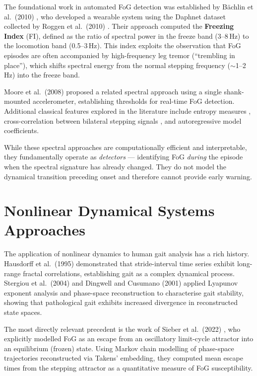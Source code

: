 \documentclass[12pt,a4paper,oneside]{report}
\numberwithin{equation}{chapter}
\numberwithin{figure}{chapter}
\numberwithin{table}{chapter}
\begin{document}
The foundational work in automated FoG detection was established by B\"{a}chlin et al.\ (2010) \cite{bachlin2010}, who developed a wearable system using the Daphnet dataset collected by Roggen et al.\ (2010) \cite{roggen2010}. Their approach computed the \textbf{Freezing Index} (FI), defined as the ratio of spectral power in the freeze band (3--8\,Hz) to the locomotion band (0.5--3\,Hz). This index exploits the observation that FoG episodes are often accompanied by high-frequency leg tremor (``trembling in place''), which shifts spectral energy from the normal stepping frequency ($\sim$1--2\,Hz) into the freeze band.

Moore et al.\ (2008) \cite{moore2008} proposed a related spectral approach using a single shank-mounted accelerometer, establishing thresholds for real-time FoG detection. Additional classical features explored in the literature include entropy measures \cite{punt2017}, cross-correlation between bilateral stepping signals \cite{mancini2012}, and autoregressive model coefficients.

While these spectral approaches are computationally efficient and interpretable, they fundamentally operate as \textit{detectors} --- identifying FoG \textit{during} the episode when the spectral signature has already changed. They do not model the dynamical transition preceding onset and therefore cannot provide early warning.

\section{Nonlinear Dynamical Systems Approaches}

The application of nonlinear dynamics to human gait analysis has a rich history. Hausdorff et al.\ (1995) \cite{hausdorff1995} demonstrated that stride-interval time series exhibit long-range fractal correlations, establishing gait as a complex dynamical process. Stergiou et al.\ (2004) \cite{stergiou2004} and Dingwell and Cusumano (2001) \cite{dingwell2001} applied Lyapunov exponent analysis and phase-space reconstruction to characterise gait stability, showing that pathological gait exhibits increased divergence in reconstructed state spaces.

The most directly relevant precedent is the work of Sieber et al.\ (2022) \cite{sieber2022}, who explicitly modelled FoG as an escape from an oscillatory limit-cycle attractor into an equilibrium (frozen) state. Using Markov chain modelling of phase-space trajectories reconstructed via Takens' embedding, they computed mean escape times from the stepping attractor as a quantitative measure of FoG susceptibility.
\end{document}

